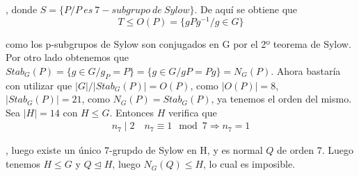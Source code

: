 \documentclass{article}
\begin{document}
\begin{enumerate}
, donde $S=\{P/P\:es\:7-subgrupo\:de\:Sylow\}$. De aquí se obtiene que 
\[T\leq O(P)=\{gPg^{-1}/g\in G\}\]

como los p-subgrupos de Sylow son conjugados en G por el 2º teorema de Sylow. Por otro lado obtenemos que $Stab_G(P)=\{g\in G/g_P=P\}=\{g\in G/gP=Pg\}=N_G(P)$. Ahora bastaría con utilizar que $|G|/|Stab_G(P)|=O(P)$, como $|O(P)|= 8$, $|Stab_G(P)|=21$, como $N_G(P)=Stab_G(P)$, ya tenemos el orden del mismo. \\

Sea $|H|=14$ con $H\leq G$. Entonces $H$ verifica que
\begin{gather*}
n_7\mid 2\quad n_7\equiv 1\mod 7\Rightarrow n_7=1
\end{gather*}

, luego existe un único 7-grupdo de Sylow en H, y es normal $Q$ de orden 7. Luego tenemos $H\leq G$ y $Q\unlhd H$, luego $N_G(Q)\leq H$, lo cual es imposible.

\end{enumerate}
\end{document}
